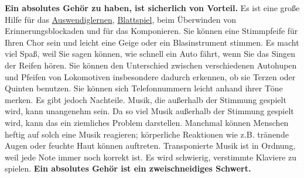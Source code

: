 \textbf{Ein absolutes Gehör zu haben, ist sicherlich von Vorteil.}
Es ist eine große Hilfe für das \hyperlink{c1iii6}{Auswendiglernen}, \hyperlink{c1iii11}{Blattspiel}, beim Überwinden von Erinnerungsblockaden und für das Komponieren.
Sie können eine Stimmpfeife für Ihren Chor sein und leicht eine Geige oder ein Blasinstrument stimmen.
Es macht viel Spaß, weil Sie sagen können, wie schnell ein Auto fährt, wenn Sie das Singen der Reifen hören.
Sie können den Unterschied zwischen verschiedenen Autohupen und Pfeifen von Lokomotiven insbesondere dadurch erkennen, ob sie Terzen oder Quinten benutzen.
Sie können sich Telefonnummern leicht anhand ihrer Töne merken.
Es gibt jedoch Nachteile.
Musik, die außerhalb der Stimmung gespielt wird, kann unangenehm sein.
Da so viel Musik außerhalb der Stimmung gespielt wird, kann das ein ziemliches Problem darstellen.
Manchmal können Menschen heftig auf solch eine Musik reagieren; körperliche Reaktionen wie z.B. tränende Augen oder feuchte Haut können auftreten.
Transponierte Musik ist in Ordnung, weil jede Note immer noch korrekt ist.
Es wird schwierig, verstimmte Klaviere zu spielen.
\textbf{Ein absolutes Gehör ist ein zweischneidiges Schwert.}


